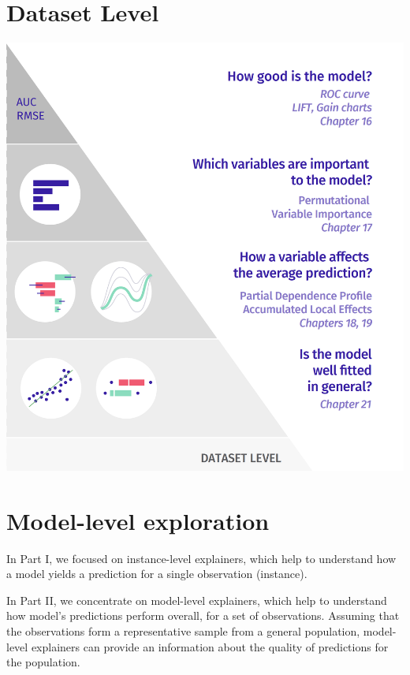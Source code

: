 \documentclass[]{krantz}
\begin{document}
\hypertarget{dataset-level}{%
\chapter*{Dataset Level}\label{dataset-level}}

\begin{center}\includegraphics[width=0.99\linewidth]{figure/UMEPpiramideDataset} \end{center}

\hypertarget{modelLevelExploration}{%
\chapter{Model-level exploration}\label{modelLevelExploration}}

In Part I, we focused on instance-level explainers, which help to understand how a model yields a prediction for a single observation (instance).

In Part II, we concentrate on model-level explainers, which help to understand how model's predictions perform overall, for a set of observations. Assuming that the observations form a representative sample from a general population, model-level explainers can provide an information about the quality of predictions for the population.
\end{document}
